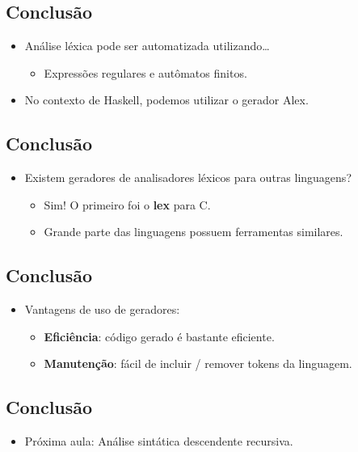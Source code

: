 \documentclass[11pt]{article}
\begin{document}
\subsection*{Conclusão}
\label{sec:org43847c1}

\begin{itemize}
\item Análise léxica pode ser automatizada utilizando\ldots{}
\begin{itemize}
\item Expressões regulares e autômatos finitos.
\end{itemize}

\item No contexto de Haskell, podemos utilizar o gerador Alex.
\end{itemize}
\subsection*{Conclusão}
\label{sec:orgeb8fdf2}

\begin{itemize}
\item Existem geradores de analisadores léxicos para outras linguagens?
\begin{itemize}
\item Sim! O primeiro foi o \textbf{\textbf{lex}} para C.
\item Grande parte das linguagens possuem ferramentas similares.
\end{itemize}
\end{itemize}
\subsection*{Conclusão}
\label{sec:orgc4635cb}

\begin{itemize}
\item Vantagens de uso de geradores:
\begin{itemize}
\item \textbf{\textbf{Eficiência}}: código gerado é bastante eficiente.
\item \textbf{\textbf{Manutenção}}: fácil de incluir / remover tokens da linguagem.
\end{itemize}
\end{itemize}
\subsection*{Conclusão}
\label{sec:org23b40d9}

\begin{itemize}
\item Próxima aula: Análise sintática descendente recursiva.
\end{itemize}
\end{document}
